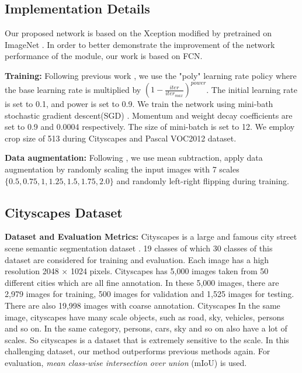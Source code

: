 \documentclass[final]{cvpr}
\begin{document}
\subsection{Implementation Details}

Our proposed network is based on the Xception modified by \cite{Deeplabv3+} pretrained on ImageNet \cite{ImageNet}. In order to better demonstrate the improvement of the network performance of the module, our work is based on FCN.

\textbf{Training:} Following previous work \cite{Deeplabv2}, we use the "poly" learning rate policy where the base learning rate is multiplied by $(1-\frac{iter}{iter_{max}})^{power}$. The initial learning rate is set to 0.1, and power is set to 0.9. We train the network using mini-bath stochastic gradient descent(SGD) \cite{ImageNet}. Momentum and weight decay coefficients are set to 0.9 and 0.0004 respectively. The size of mini-batch is set to 12. We employ crop size of 513 during Cityscapes and Pascal VOC2012 dataset.

\textbf{Data augmentation:} Following \cite{Deeplabv3}, we use mean subtraction, apply data augmentation by randomly scaling the input images with 7 scales $\{0.5, 0.75, 1, 1.25, 1.5, 1.75, 2.0\}$ and randomly left-right flipping during training.


\subsection{Cityscapes Dataset}

\textbf{Dataset and Evaluation Metrics: } Cityscapes is a large and famous city street scene semantic segmentation dataset \cite{cityscpaes}. 19 classes of which 30 classes of this dataset are considered for training and evaluation. Each image has a high resolution 2048 $\times$ 1024 pixels. Cityscapes has 5,000 images taken from 50 different cities which are all fine annotation. In these 5,000 images, there are 2,979 images for training, 500 images for validation and 1,525 images for testing. There are also 19,998 images with coarse annotation. Cityscapes In the same image, cityscapes have many scale objects, such as road, sky, vehicles, persons and so on. In the same category, persons, cars, sky and so on also have a lot of scales. So cityscapes is a dataset that is extremely sensitive to the scale. In this challenging dataset, our method outperforms previous methods again. For evaluation, \emph{mean class-wise intersection over union} (mIoU) is used.
\end{document}
